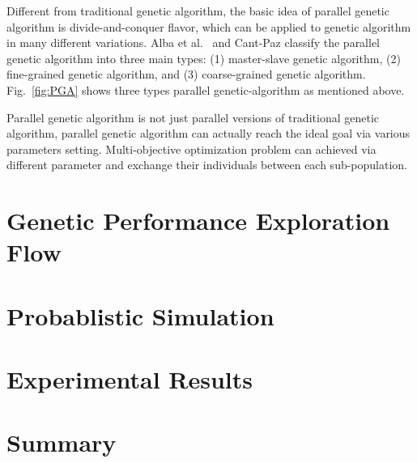       Different from traditional genetic algorithm, the basic idea of parallel genetic algorithm is divide-and-conquer flavor, which can be applied to genetic algorithm in many different variations. Alba et al.~\cite{SurveyDistPGA1997} and Cant-Paz \cite{SurveyPGA1997} classify the parallel genetic algorithm into three main types: (1) master-slave genetic algorithm, (2) fine-grained genetic algorithm, and (3) coarse-grained genetic algorithm. Fig.~\ref{fig:PGA} shows three types parallel genetic-algorithm as mentioned above.
          
      Parallel genetic algorithm is not just parallel versions of traditional genetic algorithm, parallel genetic algorithm can actually reach the ideal goal via various parameters setting. Multi-objective optimization problem can achieved via different parameter and exchange their individuals between each sub-population.

  \section{Genetic Performance Exploration Flow}\label{sec:GPEF}
  \section{Probablistic Simulation}\label{sec:ProbSimu}
  \section{Experimental Results}\label{sec:PAGEExp}

  
  \section{Summary}\label{sec:PAGESum}